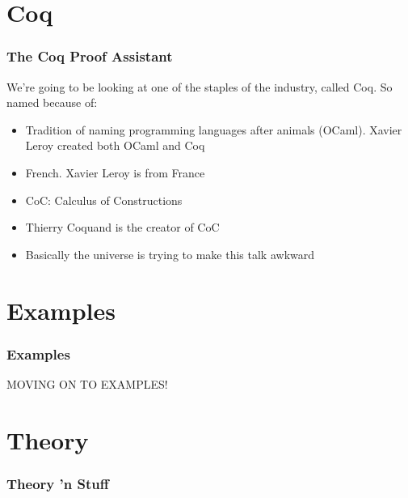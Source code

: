 \documentclass{beamer}
\begin{document}
\section{Coq}

\begin{frame}
  \frametitle{The Coq Proof Assistant}

  We're going to be looking at one of the staples of the industry, called Coq. So named because of:

  \begin{itemize}
  \item<1-> Tradition of naming programming languages after animals (OCaml). Xavier Leroy created both OCaml and Coq
  \item<2-> French. Xavier Leroy is from France
  \item<3-> CoC: Calculus of Constructions
  \item<4-> Thierry Coquand is the creator of CoC
  \item<5-> Basically the universe is trying to make this talk awkward
  \end{itemize}
\end{frame}

\section{Examples}

\begin{frame}
  \frametitle{Examples}

  \huge{MOVING ON TO EXAMPLES!}
\end{frame}

\section{Theory}

\begin{frame}
  \frametitle{Theory 'n Stuff}

\end{frame}
\end{document}
